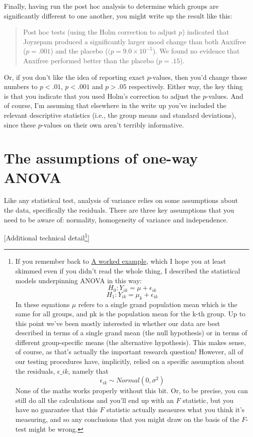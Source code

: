 \documentclass[
  a4paper,
]{book}
\begin{document}
Finally, having run the post hoc analysis to determine which groups are
significantly different to one another, you might write up the result
like this:

\begin{quote}
Post hoc tests (using the Holm correction to adjust \(p\)) indicated
that Joyzepam produced a significantly larger mood change than both
Anxifree (\(p = .001\)) and the placebo (\((p = 9.0 \times{10^{-5}}\)).
We found no evidence that Anxifree performed better than the placebo
(\(p = .15\)).
\end{quote}

Or, if you don't like the idea of reporting exact \(p\)-values, then
you'd change those numbers to \(p < .01\), \(p < .001\) and \(p > .05\)
respectively. Either way, the key thing is that you indicate that you
used Holm's correction to adjust the \(p\)-values. And of course, I'm
assuming that elsewhere in the write up you've included the relevant
descriptive statistics (i.e., the group means and standard deviations),
since these \(p\)-values on their own aren't terribly informative.

\hypertarget{the-assumptions-of-one-way-anova}{%
\section{The assumptions of one-way
ANOVA}\label{the-assumptions-of-one-way-anova}}

Like any statistical test, analysis of variance relies on some
assumptions about the data, specifically the residuals. There are three
key assumptions that you need to be aware of: normality, homogeneity of
variance and independence.

{[}Additional technical detail\footnote{If you remember back to
  \protect\hyperlink{a-worked-example}{A worked example}, which I hope
  you at least skimmed even if you didn't read the whole thing, I
  described the statistical models underpinning ANOVA in this way:
  \[H_0:Y_{ik}=\mu + \epsilon_{ik}\]
  \[H_1:Y_{ik}=\mu_k + \epsilon_{ik}\] In these equations \(\mu\) refers
  to a single grand population mean which is the same for all groups,
  and µk is the population mean for the k-th group. Up to this point
  we've been mostly interested in whether our data are best described in
  terms of a single grand mean (the null hypothesis) or in terms of
  different group-specific means (the alternative hypothesis). This
  makes sense, of course, as that's actually the important research
  question! However, all of our testing procedures have, implicitly,
  relied on a specific assumption about the residuals,
  \(\epsilon\_{ik}\), namely that
  \[\epsilon_{ik} \sim Normal(0,\sigma^2)\] None of the maths works
  properly without this bit. Or, to be precise, you can still do all the
  calculations and you'll end up with an \(F\) statistic, but you have
  no guarantee that this \(F\) statistic actually measures what you
  think it's measuring, and so any conclusions that you might draw on
  the basis of the \(F\)-test might be wrong.}{]}
\end{document}
